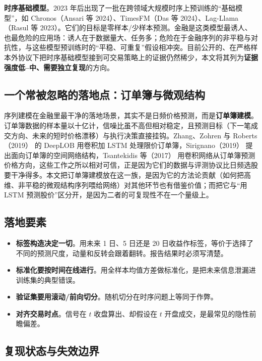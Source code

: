 \textbf{时序基础模型}。2023 年后出现了一批在跨领域大规模时序上预训练的“基础模型”，如 Chronos（Ansari 等 2024\cite{ansari2024chronos}）、TimesFM（Das 等 2024\cite{das2024timesfm}）、Lag-Llama（Rasul 等 2023\cite{rasul2023lagllama}）。它们的目标是零样本/少样本预测。金融是这类模型最诱人、也最危险的应用场：诱人在于数据量大、任务多；危险在于金融序列的非平稳与对抗性，与这些模型预训练时的“平稳、可重复”假设相冲突。目前公开的、在严格样本外协议下把时序基础模型接到可交易策略上的证据仍然稀少，本文将其列为\textbf{证据强度低--中、需要独立复现}的方向。

\subsection{一个常被忽略的落地点：订单簿与微观结构}

序列建模在金融里最干净的落地场景，其实不是日频价格预测，而是\textbf{订单簿建模}。订单簿数据的样本量以十亿计，信噪比虽不高但相对稳定，且预测目标（下一笔成交方向、未来的短时价格漂移）与执行决策直接挂钩。Zhang、Zohren 与 Roberts（2019）\cite{zhang2019deeplob} 的 DeepLOB 用卷积加 LSTM 处理限价订单簿，Sirignano（2019）\cite{sirignano2019lob} 提出面向订单簿的空间网络结构，Tsantekidis 等（2017）\cite{tsantekidis2017} 用卷积网络从订单簿预测价格方向，这些工作之所以相对可信，正是因为它们的数据与评测协议比日频选股要干净得多。本文把订单簿建模放在这一族，是因为它的方法论贡献（如何把高维、非平稳的微观结构序列喂给网络）对其他环节也有借鉴价值；而把它与“用 LSTM 预测股价”区分开，是因为二者的可复现性不在一个量级上。

\subsection{落地要素}

\begin{itemize}
  \item \textbf{标签构造决定一切}。用未来 1 日、5 日还是 20 日收益作标签，等价于选择了不同的预测尺度，动量和反转会跟着翻转。报告结果时必须写清楚。
  \item \textbf{标准化要按时间在线进行}。用全样本均值方差做标准化，是把未来信息泄漏进训练集的典型错误。
  \item \textbf{验证集要用滚动/前向切分}。随机切分在时序问题上等同于作弊。
  \item \textbf{对齐交易时点}。信号在 $t$ 收盘算出、却假设在 $t$ 开盘成交，是最常见的隐性前瞻偏差。
\end{itemize}

\subsection{复现状态与失效边界}


